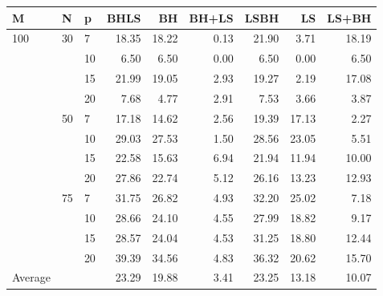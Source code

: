 \begin{center}
  \begin{tabular}{|l|l|l|rrrrrr|}
    \hline
    M & N & p & BHLS & BH & BH+LS & LSBH & LS & LS+BH \\ \hline
    100 & 30 & 7 & 18.35 & 18.22 & 0.13 & 21.90 & 3.71 & 18.19 \\
    &  & 10 & 6.50 & 6.50 & 0.00 & 6.50 & 0.00 & 6.50 \\
    &  & 15 & 21.99 & 19.05 & 2.93 & 19.27 & 2.19 & 17.08 \\
    &  & 20 & 7.68 & 4.77 & 2.91 & 7.53 & 3.66 & 3.87 \\ \cline{2-9}
    & 50 & 7 & 17.18 & 14.62 & 2.56 & 19.39 & 17.13 & 2.27 \\
    &  & 10 & 29.03 & 27.53 & 1.50 & 28.56 & 23.05 & 5.51 \\
    &  & 15 & 22.58 & 15.63 & 6.94 & 21.94 & 11.94 & 10.00 \\
    &  & 20 & 27.86 & 22.74 & 5.12 & 26.16 & 13.23 & 12.93 \\ \cline{2-9}
    & 75 & 7 & 31.75 & 26.82 & 4.93 & 32.20 & 25.02 & 7.18 \\
    &  & 10 & 28.66 & 24.10 & 4.55 & 27.99 & 18.82 & 9.17 \\
    &  & 15 & 28.57 & 24.04 & 4.53 & 31.25 & 18.80 & 12.44 \\
    &  & 20 & 39.39 & 34.56 & 4.83 & 36.32 & 20.62 & 15.70 \\ \hline
    Average &  &  & 23.29 & 19.88 & 3.41 & 23.25 & 13.18 & 10.07 \\
    \hline
  \end{tabular}
\end{center}

